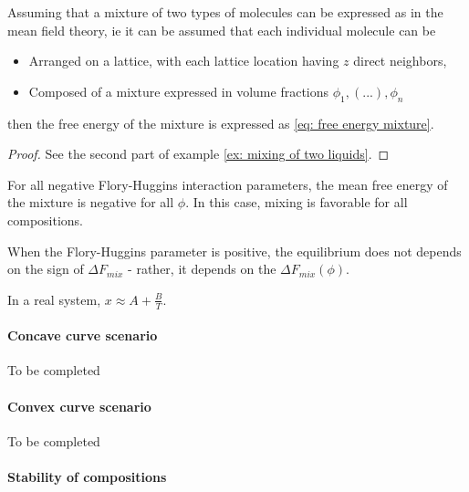 \documentclass[../phys-f308.tex]{subfiles}
\begin{document}
    \begin{theorem}
        Assuming that a mixture of two types of molecules can be expressed as in the mean field theory, ie it can be assumed that each individual molecule can be
        \begin{itemize}
            \item Arranged on a lattice, with each lattice location having $z$ direct neighbors,
            \item Composed of a mixture expressed in volume fractions $\phi_1,(...),\phi_n$
        \end{itemize}
        then the free energy of the mixture is expressed as \eqref{eq: free energy mixture}.
    \end{theorem}
    \begin{proof}
        See the second part of example \ref{ex: mixing of two liquids}.
    \end{proof}

    \begin{property}
        For all negative Flory-Huggins interaction parameters, the mean free energy of the mixture is negative for all $\phi$. In this case, mixing is favorable for all compositions.
    \end{property}
    \begin{property}
        When the Flory-Huggins parameter is positive, the equilibrium does not depends on the sign of $\Delta F_{mix}$ - rather, it depends on the $\Delta F_{mix}(\phi)$.
    \end{property}

    \begin{remark}
        In a real system, $x \approx A+\frac{B}{T}$.
    \end{remark}

    \paragraph{Concave curve scenario}

    \color{red} To be completed\color{black}

    \paragraph{Convex curve scenario}

    \color{red} To be completed\color{black}

    \paragraph{Stability of compositions}
\end{document}
